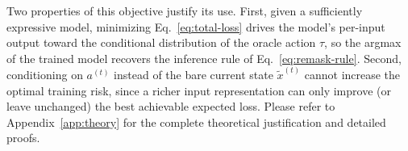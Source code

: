 Two properties of this objective justify its use. First, given a sufficiently expressive model, minimizing Eq.~\eqref{eq:total-loss} drives the model's per-input output toward the conditional distribution of the oracle action $\tau$, so the argmax of the trained model recovers the inference rule of Eq.~\eqref{eq:remask-rule}. Second, conditioning on $a^{(t)}$ instead of the bare current state $\tilde{x}^{(t)}$ cannot increase the optimal training risk, since a richer input representation can only improve (or leave unchanged) the best achievable expected loss. Please refer to Appendix~\ref{app:theory} for the complete theoretical justification and detailed proofs.